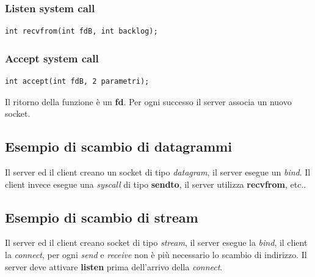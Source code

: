 \subsubsection{Listen system call}
\begin{lstlisting}[caption=Esempio di syscall listen]
int recvfrom(int fdB, int backlog);
\end{lstlisting}

\subsubsection{Accept system call}
\begin{lstlisting}[caption=Esempio di syscall accept]
int accept(int fdB, 2 parametri);
\end{lstlisting}
Il ritorno della funzione è un \textbf{fd}.
Per ogni successo il server associa un nuovo socket.

\subsection{Esempio di scambio di datagrammi}
Il server ed il client creano un socket di tipo \emph{datagram}, il server
esegue un \emph{bind}.
Il client invece esegue una \emph{syscall} di tipo \textbf{sendto}, il server
utilizza \textbf{recvfrom}, etc..

\subsection{Esempio di scambio di stream}
Il server ed il client creano socket di tipo \emph{stream}, il server esegue
la \emph{bind}, il client la \emph{connect}, per ogni \emph{send} e
\emph{receive} non è più necessario lo scambio di indirizzo.
Il server deve attivare \textbf{listen} prima dell'arrivo della \emph{connect}.

